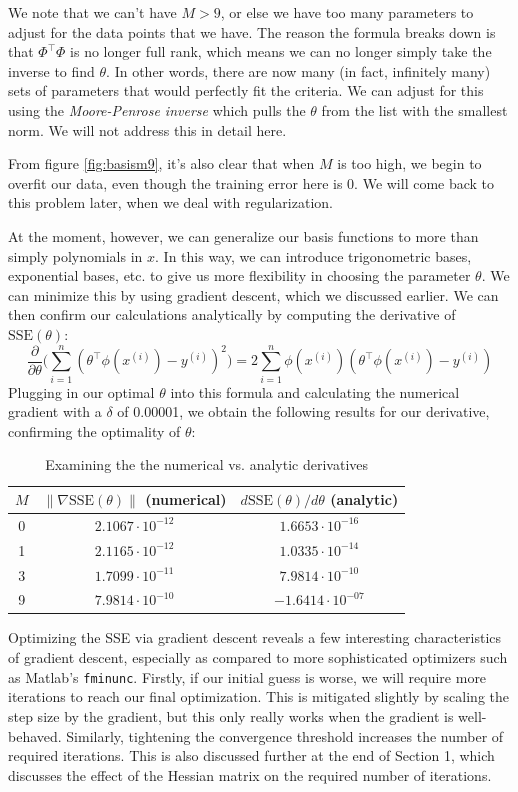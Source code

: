 \documentclass[10pt,letterpaper]{article}
\begin{document}
We note that we can't have $M > 9$, or else we have too many parameters to adjust for the data points that we have. The reason the formula breaks down is that $\Phi^\intercal\Phi$ is no longer full rank, which means we can no longer simply take the inverse to find $\theta$. In other words, there are now many (in fact, infinitely many) sets of parameters that would perfectly fit the criteria. We can adjust for this using the \textit{Moore-Penrose inverse} which pulls the $\theta$ from the list with the smallest norm. We will not address this in detail here.

From figure \ref{fig:basism9}, it's also clear that when $M$ is too high, we begin to overfit our data, even though the training error here is $0$. We will come back to this problem later, when we deal with regularization.

At the moment, however, we can generalize our basis functions to more than simply polynomials in $x$. In this way, we can introduce trigonometric bases, exponential bases, etc. to give us more flexibility in choosing the parameter $\theta$. 
We can minimize this by using gradient descent, which we discussed earlier. We can then confirm our calculations analytically by computing the derivative of $\text{SSE}(\theta)$:
\[ \frac{\partial}{\partial\theta}\Big(\sum_{i=1}^n (\theta^\intercal\phi(x^{(i)}) - y^{(i)})^2\Big) = 2\sum_{i=1}^n \phi(x^{(i)})(\theta^\intercal\phi(x^{(i)}) - y^{(i)}) \]
Plugging in our optimal $\theta$ into this formula and calculating the numerical gradient with a $\delta$ of 0.00001, we obtain the following results for our derivative, confirming the optimality of $\theta$:
\begin{table}[h]
\centering
\caption{Examining the the numerical vs. analytic derivatives}
\begin{tabular}{c|c|c}
$M$& $\lVert\nabla\text{SSE}(\theta)\rVert$ (numerical) & $d\text{SSE} (\theta)/d\theta$ (analytic)\\\hline
0       &  $2.1067\cdot10^{-12}$  & $1.6653\cdot10^{-16}$   \\
1       & $2.1165\cdot10^{-12}$  & $1.0335\cdot10^{-14}$ \\
3       & $1.7099\cdot10^{-11}$ & $7.9814\cdot10^{-10}$  \\
9      &   $7.9814\cdot 10^{-10}$    & $-1.6414\cdot 10^{-07}$
\end{tabular}
\end{table}

Optimizing the SSE via gradient descent reveals a few interesting characteristics of gradient descent, especially as compared to more sophisticated optimizers such as Matlab's \texttt{fminunc}. Firstly, if our initial guess is worse, we will require more iterations to reach our final optimization. This is mitigated slightly by scaling the step size by the gradient, but this only really works when the gradient is well-behaved. Similarly, tightening the convergence threshold increases the number of required iterations. This is also discussed further at the end of Section 1, which discusses the effect of the Hessian matrix on the required number of iterations.
\end{document}
